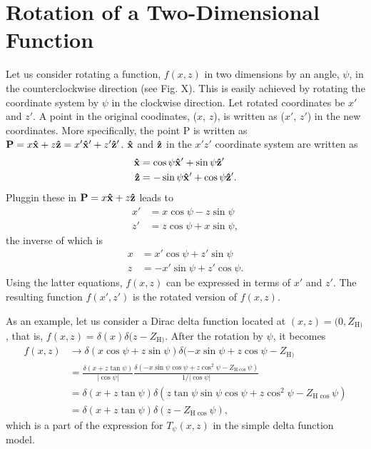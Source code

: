 \documentclass[12pt,letterpaper]{article}
\newcommand{\zh}[1]{Z_{\mathrm{H}#1}}
\begin{document}
\section{Rotation of a Two-Dimensional Function}
Let us consider rotating a function, $f(x,z)$ in two dimensions by an angle, 
$\psi$, in the counterclockwise direction (see Fig. X). This is easily 
achieved by rotating the coordinate system by $\psi$ in the clockwise direction. 
Let rotated coordinates be $x'$ and $z'$. A point in the original coodinates,
($x$, $z$), is written as ($x'$, $z'$) in the new coordinates. More specifically,
the point P is written as 
$\mathbf{P}=x\mathbf{\hat{x}}+z\mathbf{\hat{z}}=x'\mathbf{\hat{x}}'+z'\mathbf{\hat{z}}'$. $\mathbf{\hat{x}}$ and $\mathbf{\hat{z}}$ in
the $x'z'$ coordinate system are written as 
\begin{align}
  \mathbf{\hat{x}} &= \cos\psi\mathbf{\hat{x}}'+\sin\psi\mathbf{\hat{z}}' \\
  \mathbf{\hat{z}} &= -\sin\psi\mathbf{\hat{x}}'+\cos\psi\mathbf{\hat{z}}'.
\end{align}
Pluggin these in $\mathbf{P}=x\mathbf{\hat{x}}+z\mathbf{\hat{z}}$ leads to
\begin{align}
  x' &= x\cos\psi - z\sin\psi \\
  z' &= z\cos\psi + x\sin\psi,
\end{align}
the inverse of which is
\begin{align}
  x &= x'\cos\psi + z'\sin\psi \\
  z &= -x'\sin\psi + z'\cos\psi.
\end{align}
Using the latter equations, $f(x,z)$ can be expressed in terms of $x'$ and $z'$. 
The resulting function $f(x',z')$ is the rotated version of $f(x,z)$. 

As an 
example, let us consider a Dirac delta function located at $(x,z)=(0,\zh)$,
that is, $f(x,z)=\delta(x)\delta(z-\zh)$. After the rotation by $\psi$, it 
becomes
\begin{align*}
  f(x,z) 
  &\rightarrow 
    \delta(x\cos\psi+z\sin\psi) \delta(-x\sin\psi+z\cos\psi-\zh) \\
  &= \frac{\delta(x+z\tan\psi)}{|\cos\psi|}
     \frac{\delta(-x\sin\psi\cos\psi+z\cos^2\psi-\zh\cos\psi)}{1/|\cos\psi|} \\
  &= \delta(x+z\tan\psi)\delta(z\tan\psi\sin\psi\cos\psi+z\cos^2\psi-\zh\cos\psi) \\
  &= \delta(x+z\tan\psi)\delta(z-\zh\cos\psi),
\end{align*}
which is a part of the expression for $T_\psi(x,z)$ in the simple delta 
function model.
\end{document}
